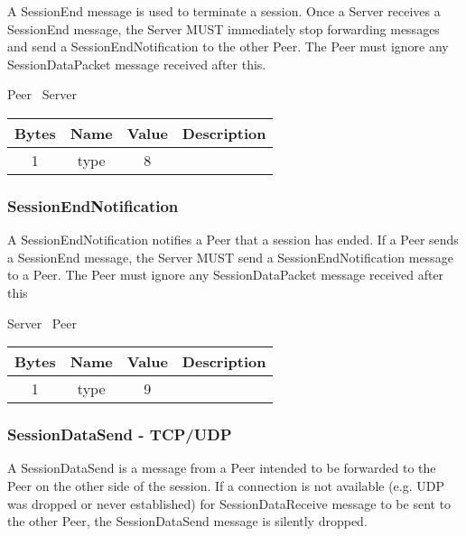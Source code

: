 A SessionEnd message is used to terminate a session. Once a Server receives a SessionEnd message, the Server
MUST immediately stop forwarding messages and send a SessionEndNotification to the other Peer. The Peer must ignore
any SessionDataPacket message received after this.

\begin{center}
    Peer \textrightarrow\ Server\\
    \begin{tabular}{|c|c|c|c|}
        \hline
        \textbf{Bytes} & \textbf{Name} & \textbf{Value} & \textbf{Description} \\
        \hline
        1              & type          & 8              &                      \\
        \hline
    \end{tabular}
\end{center}

\subsubsection{SessionEndNotification}

A SessionEndNotification notifies a Peer that a session has ended. If a Peer sends a SessionEnd
message, the Server MUST send a SessionEndNotification message to a Peer. The Peer must ignore
any SessionDataPacket message received after this

\begin{center}
    Server \textrightarrow\ Peer\\
    \begin{tabular}{|c|c|c|c|}
        \hline
        \textbf{Bytes} & \textbf{Name} & \textbf{Value} & \textbf{Description} \\
        \hline
        1              & type          & 9              &                      \\
        \hline
    \end{tabular}
\end{center}

\subsubsection{SessionDataSend - TCP/UDP}

A SessionDataSend is a message from a Peer intended to be forwarded to the Peer on the other side of the
session. If a connection is not available (e.g. UDP was dropped or never established) for
SessionDataReceive message to be sent to the other Peer, the SessionDataSend message is silently dropped.

